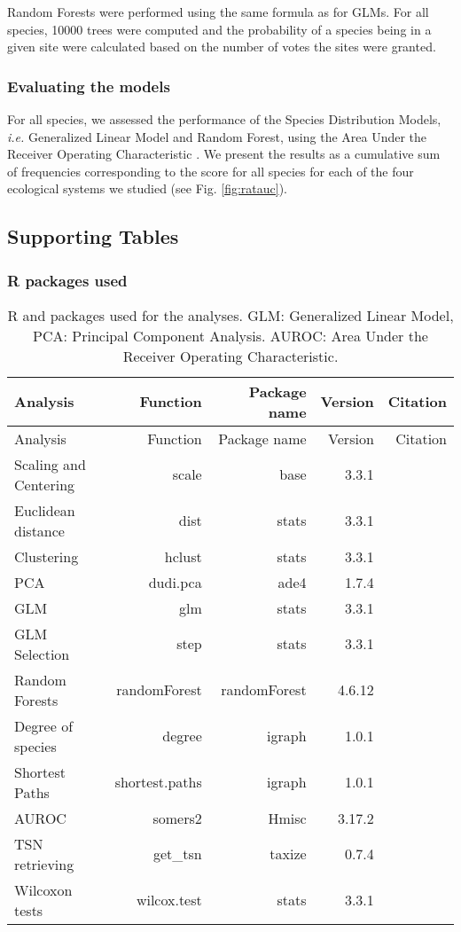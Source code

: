 Random Forests \citep{Prasad2006} were performed using the same formula
as for GLMs. For all species, 10000 trees were computed and the
probability of a species being in a given site were calculated based on
the number of votes the sites were granted.

\subsubsection{Evaluating the models}\label{evaluating-the-models}

For all species, we assessed the performance of the Species Distribution
Models, \emph{i.e.} Generalized Linear Model and Random Forest, using
the Area Under the Receiver Operating Characteristic
\citep[AUROC,][]{Elith2006}. We present the results as a cumulative sum
of frequencies corresponding to the score for all species for each of
the four ecological systems we studied (see Fig. \ref{fig:ratauc}).

\subsection{Supporting Tables}\label{supporting-tables}


\begin{landscape}

\subsubsection{R packages used}\label{r-packages-used}

\begin{longtable}[]{@{}lrrrr@{}}
\caption{R and packages used for the analyses. GLM: Generalized Linear
Model, PCA: Principal Component Analysis. AUROC: Area Under the Receiver
Operating Characteristic. \label{tbl:rpkges}}\tabularnewline
\toprule
Analysis & Function & Package name & Version & Citation\tabularnewline
\midrule
\endfirsthead
\toprule
Analysis & Function & Package name & Version & Citation\tabularnewline
\midrule
\endhead
Scaling and Centering & scale & base & 3.3.1 &
\citet{Rcoreteam2015}\tabularnewline
Euclidean distance & dist & stats & 3.3.1 &
\citet{Rcoreteam2015}\tabularnewline
Clustering & hclust & stats & 3.3.1 &
\citet{Rcoreteam2015}\tabularnewline
PCA & dudi.pca & ade4 & 1.7.4 & \citet{Dray2007}\tabularnewline
GLM & glm & stats & 3.3.1 & \citet{Rcoreteam2015}\tabularnewline
GLM Selection & step & stats & 3.3.1 &
\citet{Rcoreteam2015}\tabularnewline
Random Forests & randomForest & randomForest & 4.6.12 &
\citet{Liaw2002}\tabularnewline
Degree of species & degree & igraph & 1.0.1 &
\citet{Csardi2006}\tabularnewline
Shortest Paths & shortest.paths & igraph & 1.0.1 &
\citet{Csardi2006}\tabularnewline
AUROC & somers2 & Hmisc & 3.17.2 & \citet{HarrellJr2016}\tabularnewline
TSN retrieving & get\_tsn & taxize & 0.7.4 &
\citet{Chamberlain2013}\tabularnewline
Wilcoxon tests & wilcox.test & stats & 3.3.1 &
\citet{Rcoreteam2015}\tabularnewline
\bottomrule
\end{longtable}

\end{landscape}

